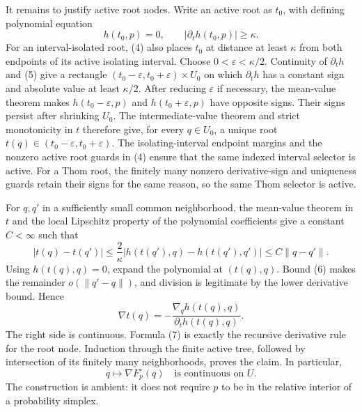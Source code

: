 It remains to justify active root nodes.  Write an active root as \(t_0\), with defining polynomial equation
\[
 h(t_0,p)=0,
 \qquad
 |\partial_t h(t_0,p)|\geq\kappa. \tag{5}
\]
For an interval-isolated root, (4) also places \(t_0\) at distance at least \(\kappa\) from both endpoints of its active isolating interval.  Choose \(0<\varepsilon<\kappa/2\).  Continuity of \(\partial_t h\) and (5) give a rectangle \((t_0-\varepsilon,t_0+\varepsilon)\times U_0\) on which \(\partial_t h\) has a constant sign and absolute value at least \(\kappa/2\).  After reducing \(\varepsilon\) if necessary, the mean-value theorem makes \(h(t_0-\varepsilon,p)\) and \(h(t_0+\varepsilon,p)\) have opposite signs.  Their signs persist after shrinking \(U_0\).  The intermediate-value theorem and strict monotonicity in \(t\) therefore give, for every \(q\in U_0\), a unique root \(t(q)\in(t_0-\varepsilon,t_0+\varepsilon)\).  The isolating-interval endpoint margins and the nonzero active root guards in (4) ensure that the same indexed interval selector is active.  For a Thom root, the finitely many nonzero derivative-sign and uniqueness guards retain their signs for the same reason, so the same Thom selector is active.

For \(q,q'\) in a sufficiently small common neighborhood, the mean-value theorem in \(t\) and the local Lipschitz property of the polynomial coefficients give a constant \(C<\infty\) such that
\[
 |t(q)-t(q')|
 \leq \frac{2}{\kappa}
       |h(t(q'),q)-h(t(q'),q')|
 \leq C\lVert q-q'\rVert. \tag{6}
\]
Using \(h(t(q),q)=0\), expand the polynomial at \((t(q),q)\).  Bound (6) makes the remainder \(o(\lVert q'-q\rVert)\), and division is legitimate by the lower derivative bound.  Hence
\[
 \nabla t(q)
 =-\frac{\nabla_q h(t(q),q)}{\partial_t h(t(q),q)}. \tag{7}
\]
The right side is continuous.  Formula (7) is exactly the recursive derivative rule for the root node.  Induction through the finite active tree, followed by intersection of its finitely many neighborhoods, proves the claim.  In particular,
\[
 q\longmapsto\nabla F_p^{\circ}(q)
 \quad\text{is continuous on }U. \tag{8}
\]
The construction is ambient: it does not require \(p\) to be in the relative interior of a probability simplex.

